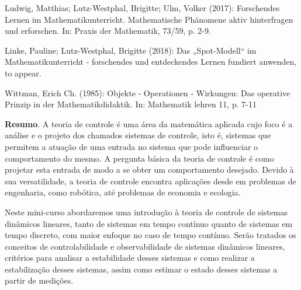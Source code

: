 		
	\begin{thebibliography}{999}
	 Ludwig, Matthias; Lutz-Westphal, Brigitte; Ulm, Volker (2017): Forschendes Lernen im Mathematikunterricht. Mathematische Phänomene aktiv hinterfragen und erforschen. In: Praxis der Mathematik, 73/59, p. 2-9.
	
	 Linke, Pauline; Lutz-Westphal, Brigitte (2018): Das „Spot-Modell“ im Mathematikunterricht - forschendes und entdeckendes Lernen fundiert anwenden, to appear.
	
	 Wittman, Erich Ch. (1985): Objekte - Operationen - Wirkungen: Das operative Prinzip in der Mathematikdidaktik. In: Mathematik lehren 11, p. 7-11
	\end{thebibliography}
	
		\vspace{24pt}
	

	
	
	\noindent\textbf{Resumo}.\label{htmk} 
	A teoria de controle é uma área da matemática aplicada cujo foco é a análise e o projeto dos chamados sistemas de controle, isto é, sistemas que permitem a atuação de uma entrada no sistema que pode influenciar o comportamento do mesmo. A pergunta básica da teoria de controle é como projetar esta entrada de modo a se obter um comportamento desejado. Devido à sua versatilidade, a teoria de controle encontra aplicações desde em problemas de engenharia, como robótica, até problemas de economia e ecologia.
	
	Neste mini-curso abordaremos uma introdução à teoria de controle de sistemas dinâmicos lineares, tanto de sistemas em tempo contínuo quanto de sistemas em tempo discreto, com maior enfoque no caso de tempo contínuo. Serão tratados os conceitos de controlabilidade e observabilidade de sistemas dinâmicos lineares, critérios para analisar a estabilidade desses sistemas e como realizar a estabilização desses sistemas, assim como estimar o estado desses sistemas a partir de medições.
	
	\vspace{24pt}

